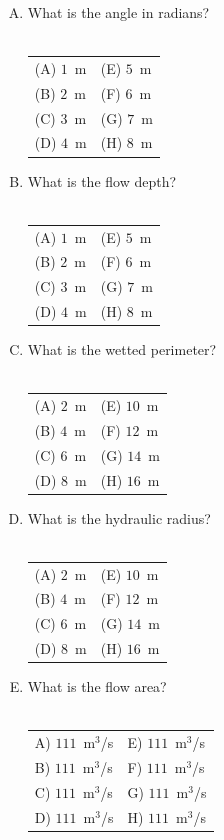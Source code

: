 \documentclass[11pt]{article}
\begin{document}
\begin{enumerate}
\begin{enumerate}[A)]
\item What is the angle in radians? \\~\\
\begin{tabular}{p{2in} p{2in}  } 
(A) $1$~m & (E) $5$~m \\ 
(B) $2$~m & (F) $6$~m  \\
(C) $3$~m & (G) $7$~m  \\
(D) $4$~m & (H) $8$~m  \\
\end{tabular}
\item What is the flow depth?\\~\\
\begin{tabular}{p{2in} p{2in}  } 
(A) $1$~m & (E) $5$~m \\ 
(B) $2$~m & (F) $6$~m  \\
(C) $3$~m & (G) $7$~m  \\
(D) $4$~m & (H) $8$~m  \\
\end{tabular}
\item What is the wetted perimeter?\\~\\
\begin{tabular}{p{2in} p{2in}  } 
(A) $2$~m & (E) $10$~m \\ 
(B) $4$~m & (F) $12$~m  \\
(C) $6$~m & (G) $14$~m  \\
(D) $8$~m & (H) $16$~m  \\
\end{tabular}
\item What is the hydraulic radius?\\~\\
\begin{tabular}{p{2in} p{2in}  } 
(A) $2$~m & (E) $10$~m \\ 
(B) $4$~m & (F) $12$~m  \\
(C) $6$~m & (G) $14$~m  \\
(D) $8$~m & (H) $16$~m  \\
\end{tabular}

\item What is the flow area?\\~\\
\begin{tabular}{p{2in} p{2in}  } 
A) $111$~m$^3$/s & E) $111$~m$^3$/s \\ 
B) $111$~m$^3$/s & F) $111$~m$^3$/s  \\
C) $111$~m$^3$/s & G) $111$~m$^3$/s  \\
D) $111$~m$^3$/s & H) $111$~m$^3$/s  \\
\end{tabular}


\end{enumerate}
\end{enumerate}
\end{document}
